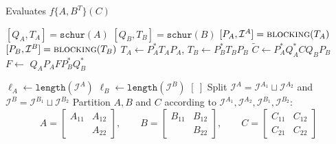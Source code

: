 \documentclass{siamart1116}
\begin{document}
  \begin{algorithm} 
	\small 
	\caption{Evaluates $f\{A,B^T\}(C)$}\label{alg:fun2m}
	\begin{algorithmic}[1]
\Return {}
\Return {}
\Return {}
\Else
\State $[Q_A,T_A]=\texttt{schur}(A)$
\State $[Q_B,T_B]=\texttt{schur}(B)$
\State $[P_A, \mathcal I^A]=\Call{blocking}{T_A}$
\State $[P_B, \mathcal I^B]=\Call{blocking}{T_B}$
\State $T_A\gets P_A^*T_AP_A$, $T_B\gets P_B^*T_BP_B$
\State $\widetilde C\gets P_A^*Q_A^*CQ_BP_B$
\State$F\gets$
\State \Return $Q_AP_AFP_B^*Q_B^*$
		\EndIf
		\EndProcedure
	\end{algorithmic}
\begin{algorithmic}[1]
\State $\ell_A\gets \texttt{length}(\mathcal I^A)$
\State $\ell_B\gets \texttt{length}(\mathcal I^B)$
\Return $[\ ]$
\Return {}
\Else
\State Split $\mathcal I^{A}=\mathcal I^{A_1}\sqcup \mathcal I^{A_2}$ and $\mathcal I^{B}=\mathcal I^{B_1}\sqcup \mathcal I^{B_2}$ 
\State Partition $A,B$ and $C$ according to $\mathcal I^{A_1},\mathcal I^{A_2},\mathcal I^{B_1},\mathcal I^{B_2}$:
\[
A=\begin{bmatrix}
A_{11}&A_{12}\\ &A_{22}
\end{bmatrix},\qquad B=\begin{bmatrix}
B_{11}&B_{12}\\ &B_{22}
\end{bmatrix},\qquad C=\begin{bmatrix}
C_{11}&C_{12}\\ C_{21}&C_{22}
\end{bmatrix}
\]
\end{algorithmic}
\end{algorithm}
\end{document}
